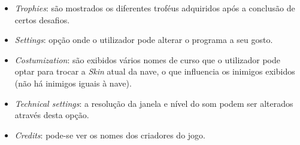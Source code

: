 \documentclass[a4paper,11pt]{article}
\begin{document}
\begin{itemize}
    \item \textit{Trophies}: são mostrados os diferentes troféus adquiridos após a conclusão de certos desafios. 

    \item \textit{Settings}: opção onde o utilizador pode alterar o programa a seu gosto.
    \item  \textit{Costumization}: são exibidos vários nomes de curso que o utilizador pode optar para trocar a \textit{Skin} atual da nave, o que influencia os inimigos exibidos (não há inimigos iguais à nave).
    \item  \textit{Technical settings}: a resolução da janela e nível do som podem ser alterados através desta opção.

    \item \textit{Credits}: pode-se ver os nomes dos criadores do jogo. 
    
\end{itemize}
	    
\end{document}
